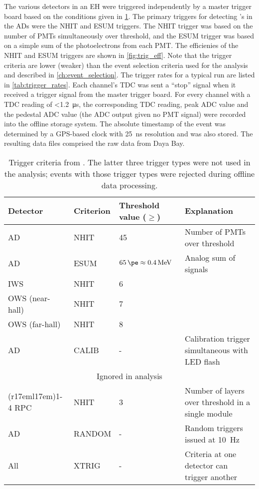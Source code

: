 The various detectors in an EH were triggered independently
by a master trigger board based on the conditions given in \cref{tab:trigger}.
The primary triggers for detecting \nuebar{}'s in the ADs were the NHIT and ESUM triggers.
The NHIT trigger was based on the number of PMTs simultaneously over threshold,
and the ESUM trigger was based on a simple sum of the photoelectrons
from each PMT.
The efficienies of the NHIT and ESUM triggers are shown in \cref{fig:trig_eff}.
Note that the trigger criteria are lower (weaker) than the event selection
criteria used for the \thetaot{} analysis and described in \cref{ch:event_selection}.
The trigger rates for a typical run are listed in \cref{tab:trigger_rates}.
Each channel's TDC was sent a ``stop'' signal when it received a trigger signal
from the master trigger board.
For every channel with a TDC reading of \SI{<1.2}{\us},
the corresponding TDC reading, peak ADC value and the pedestal ADC value
(the ADC output given no PMT signal)
were recorded into the offline storage system.
The absolute timestamp of the event was determined by a GPS-based clock
with \SI{25}{\ns} resolution and was also stored.
The resulting data files comprised the raw data from Daya Bay.

\begin{table}[ht]
    \centering
    \begin{tabular}[t]{lllp{6cm}}
        \toprule
        Detector & Criterion & Threshold value ($\geq$) & Explanation\\
        \midrule
        AD & NHIT & \num{45} & Number of PMTs over threshold \\
        AD & ESUM & $\SI{65}{\pe}\approx \SI{0.4}{\MeV}$ & Analog sum of signals \\
        IWS & NHIT & \num{6} & \\
        OWS (near-hall) & NHIT & \num{7} & \\
        OWS (far-hall) & NHIT & \num{8} & \\
        AD & CALIB & - & Calibration trigger simultaneous with LED flash \\
        \midrule
        \multicolumn{4}{c}{Ignored in \thetaot{} analysis} \\
        \cmidrule(r{17em}l{17em}){1-4}
        RPC & NHIT & \num{3} & Number of layers over threshold in a single module \\
        AD & RANDOM & - & Random triggers issued at \SI{10}{\Hz} \\
        All & XTRIG & - & Criteria at one detector can trigger another \\
        \bottomrule
    \end{tabular}
    \caption[Trigger criteria]{
        Trigger criteria from \cite{ngd2016}.
        The latter three trigger types were not used in the \thetaot{} analysis;
        events with those trigger types were rejected
        during offline data processing.
    }
    \label{tab:trigger}
\end{table}

